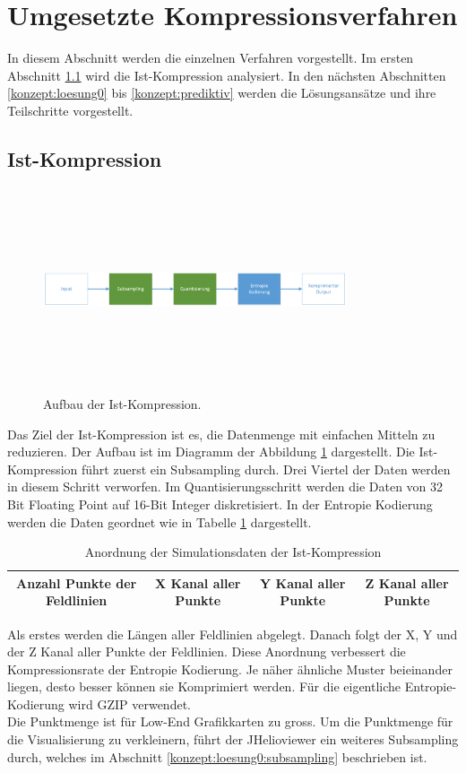 \section{Umgesetzte Kompressionsverfahren} \label{konzept}
In diesem Abschnitt werden die einzelnen Verfahren vorgestellt. Im ersten Abschnitt \ref{konzept:ist-komprimierung} wird die Ist-Kompression analysiert. In den nächsten Abschnitten \ref{konzept:loesung0} bis \ref{konzept:prediktiv} werden die Lösungsansätze und ihre Teilschritte vorgestellt.

\subsection{Ist-Kompression} \label{konzept:ist-komprimierung}
\begin{figure}[!htbp]
	\center
	\includegraphics[width=0.8\textwidth,height=6cm,keepaspectratio]{./pictures/konzept/ist/aufbau.png}
	\caption{Aufbau der Ist-Kompression.}
	\label{konzept:ist:aufbau:diagramm}
\end{figure}
Das Ziel der Ist-Kompression ist es, die Datenmenge mit einfachen Mitteln zu reduzieren. Der Aufbau ist im Diagramm der Abbildung \ref{konzept:ist:aufbau:diagramm} dargestellt. Die Ist-Kompression führt zuerst ein Subsampling durch. Drei Viertel der Daten werden in diesem Schritt verworfen. Im Quantisierungsschritt werden die Daten von 32 Bit Floating Point auf 16-Bit Integer diskretisiert. In der Entropie Kodierung werden die Daten geordnet wie in Tabelle \ref{konzept:ist:entropie} dargestellt.
\begin{table}[!htbp]
	\center
	\begin{tabular}{|c|c|c|c|}
	\hline
	Anzahl Punkte der Feldlinien & X Kanal aller Punkte & Y Kanal aller Punkte & Z Kanal aller Punkte \\\hline
	\end{tabular}
	\caption{Anordnung der Simulationsdaten der Ist-Kompression}
	\label{konzept:ist:entropie}
\end{table}
Als erstes werden die Längen aller Feldlinien abgelegt. Danach folgt der X, Y und der Z Kanal aller Punkte der Feldlinien. Diese Anordnung verbessert die Kompressionsrate der Entropie Kodierung. Je näher ähnliche Muster beieinander liegen, desto besser können sie Komprimiert werden. Für die eigentliche Entropie-Kodierung wird GZIP verwendet.\\
Die Punktmenge ist für Low-End Grafikkarten zu gross. Um die Punktmenge für die Visualisierung zu verkleinern, führt der JHelioviewer ein weiteres Subsampling durch, welches im Abschnitt \ref{konzept:loesung0:subsampling} beschrieben ist.

